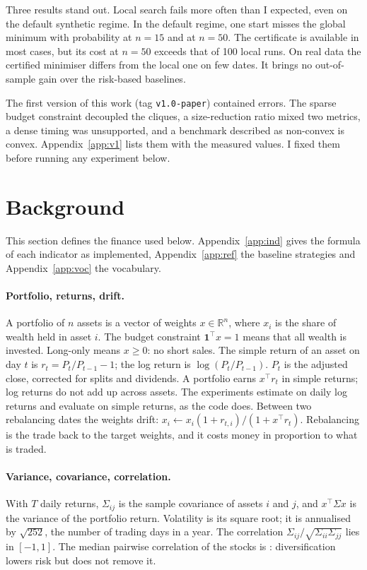 \documentclass[11pt,a4paper]{article}
\newcommand{\R}{\mathbb{R}}
\begin{document}
Three results stand out.
Local search fails more often than I expected, even on the default synthetic regime.
In the default regime, one start misses the global minimum with probability \aPfDefFifteen{} at $n=15$ and \aPfDefFifty{} at $n=50$.
The certificate is available in most cases, but its cost at $n=50$ exceeds that of 100 local runs.
On real data the certified minimiser differs from the local one on few dates.
It brings no out-of-sample gain over the risk-based baselines.

The first version of this work (tag \texttt{v1.0-paper}) contained errors.
The sparse budget constraint decoupled the cliques, a size-reduction ratio mixed two metrics, a dense timing was unsupported, and a benchmark described as non-convex is convex.
Appendix~\ref{app:v1} lists them with the measured values.
I fixed them before running any experiment below.

\section{Background}\label{sec:bg}
This section defines the finance used below.
Appendix~\ref{app:ind} gives the formula of each indicator as implemented, Appendix~\ref{app:ref} the baseline strategies and Appendix~\ref{app:voc} the vocabulary.

\paragraph{Portfolio, returns, drift.}
A portfolio of $n$ assets is a vector of weights $x\in\R^n$, where $x_i$ is the share of wealth held in asset $i$.
The budget constraint $\mathbf 1^\top x=1$ means that all wealth is invested.
Long-only means $x\ge0$: no short sales.
The simple return of an asset on day $t$ is $r_t=P_t/P_{t-1}-1$; the log return is $\log(P_t/P_{t-1})$.
$P_t$ is the adjusted close, corrected for splits and dividends.
A portfolio earns $x^\top r_t$ in simple returns; log returns do not add up across assets.
The experiments estimate on daily log returns and evaluate on simple returns, as the code does.
Between two rebalancing dates the weights drift: $x_i\leftarrow x_i(1+r_{t,i})/(1+x^\top r_t)$.
Rebalancing is the trade back to the target weights, and it costs money in proportion to what is traded.

\paragraph{Variance, covariance, correlation.}
With $T$ daily returns, $\Sigma_{ij}$ is the sample covariance of assets $i$ and $j$, and $x^\top\Sigma x$ is the variance of the portfolio return.
Volatility is its square root; it is annualised by $\sqrt{252}$, the number of trading days in a year.
The correlation $\Sigma_{ij}/\sqrt{\Sigma_{ii}\Sigma_{jj}}$ lies in $[-1,1]$.
The median pairwise correlation of the \uN{} stocks is \uCorr: diversification lowers risk but does not remove it.
\end{document}
